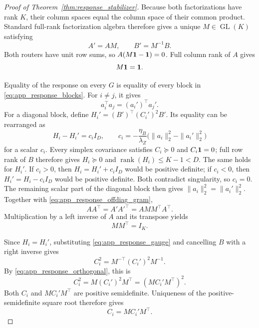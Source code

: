 \begin{proof}[Proof of Theorem~\ref{thm:response_stabilizer}]
Because both factorizations have rank \(K\), their column spaces equal the
column space of their common product.  Standard full-rank factorization
algebra therefore gives a unique \(M\in\operatorname{GL}(K)\) satisfying
\begin{equation}
 A'=AM,\qquad B'=M^{-1}B.
 \label{eq:app_response_gauge}
\end{equation}
Both routers have unit row sums, so
\(A(M\mathbf{1}-\mathbf{1})=0\).  Full column rank of \(A\) gives
\begin{equation}
 M\mathbf{1}=\mathbf{1}.
 \label{eq:app_response_rowsum}
\end{equation}

Equality of the response on every \(G\) is equality of every block in
\eqref{eq:app_response_blocks}.  For \(i\ne j\), it gives
\begin{equation}
 a_i^\top a_j=(a_i')^\top a_j'.
 \label{eq:app_response_offdiag_gram}
\end{equation}
For a diagonal block, define
\(H_i'=(B')^\top(C_i')^2B'\).  Its equality can be rearranged as
\begin{equation}
 H_i-H_i'=c_iI_D,
 \qquad
 c_i=-\frac{\eta_B}{\lambda_Z}
   \bigl(\|a_i\|_2^2-\|a_i'\|_2^2\bigr)
 \label{eq:app_response_scalar_identity}
\end{equation}
for a scalar \(c_i\).  Every simplex covariance satisfies
\(C_i\succeq0\) and \(C_i\mathbf{1}=0\); full row rank of \(B\) therefore gives
\(H_i\succeq0\) and \(\operatorname{rank}(H_i)\le K-1<D\).  The same holds for
\(H_i'\).  If \(c_i>0\), then \(H_i=H_i'+c_iI_D\) would be positive
definite; if \(c_i<0\), then \(H_i'=H_i-c_iI_D\) would be positive definite.
Both contradict singularity, so \(c_i=0\).  The remaining scalar part of the
diagonal block then gives
\(\|a_i\|_2^2=\|a_i'\|_2^2\).  Together with
\eqref{eq:app_response_offdiag_gram},
\begin{equation}
 AA^\top=A'A'^\top=AMM^\top A^\top.
\end{equation}
Multiplication by a left inverse of \(A\) and its transpose yields
\begin{equation}
 MM^\top=I_K.
 \label{eq:app_response_orthogonal}
\end{equation}

Since \(H_i=H_i'\), substituting \eqref{eq:app_response_gauge} and cancelling
\(B\) with a right inverse gives
\begin{equation}
 C_i^2=M^{-\top}(C_i')^2M^{-1}.
\end{equation}
By \eqref{eq:app_response_orthogonal}, this is
\begin{equation}
 C_i^2=M(C_i')^2M^\top=(MC_i'M^\top)^2.
\end{equation}
Both \(C_i\) and \(MC_i'M^\top\) are positive semidefinite.  Uniqueness of
the positive-semidefinite square root therefore gives
\begin{equation}
 C_i=MC_i'M^\top.
 \label{eq:app_response_jacobian_conjugacy}
\end{equation}


\end{proof}
